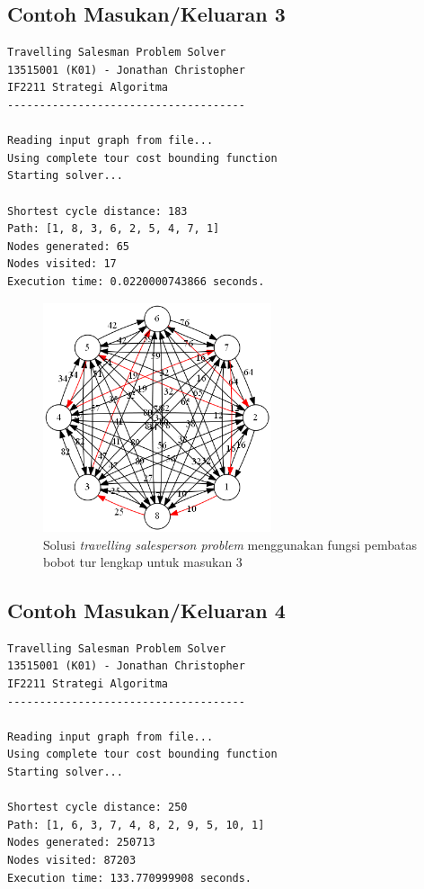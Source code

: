 \documentclass[a4paper,titlepage]{article}
\begin{document}
		\subsection{Contoh Masukan/Keluaran 3}

		

		\begin{lstlisting}
Travelling Salesman Problem Solver
13515001 (K01) - Jonathan Christopher
IF2211 Strategi Algoritma
-------------------------------------

Reading input graph from file...
Using complete tour cost bounding function
Starting solver...

Shortest cycle distance: 183
Path: [1, 8, 3, 6, 2, 5, 4, 7, 1]
Nodes generated: 65
Nodes visited: 17
Execution time: 0.0220000743866 seconds.
		\end{lstlisting}

		\begin{figure}[H]
		    \centering
		    \includegraphics[width=0.6\textwidth]{3.png}
		    \caption{Solusi \textit{travelling salesperson problem} menggunakan fungsi pembatas bobot tur lengkap untuk masukan 3}
		    \label{fig:hasileksekusi3}
		\end{figure}

		\subsection{Contoh Masukan/Keluaran 4}

		

		\begin{lstlisting}
Travelling Salesman Problem Solver
13515001 (K01) - Jonathan Christopher
IF2211 Strategi Algoritma
-------------------------------------

Reading input graph from file...
Using complete tour cost bounding function
Starting solver...

Shortest cycle distance: 250
Path: [1, 6, 3, 7, 4, 8, 2, 9, 5, 10, 1]
Nodes generated: 250713
Nodes visited: 87203
Execution time: 133.770999908 seconds.
		\end{lstlisting}
\end{document}
